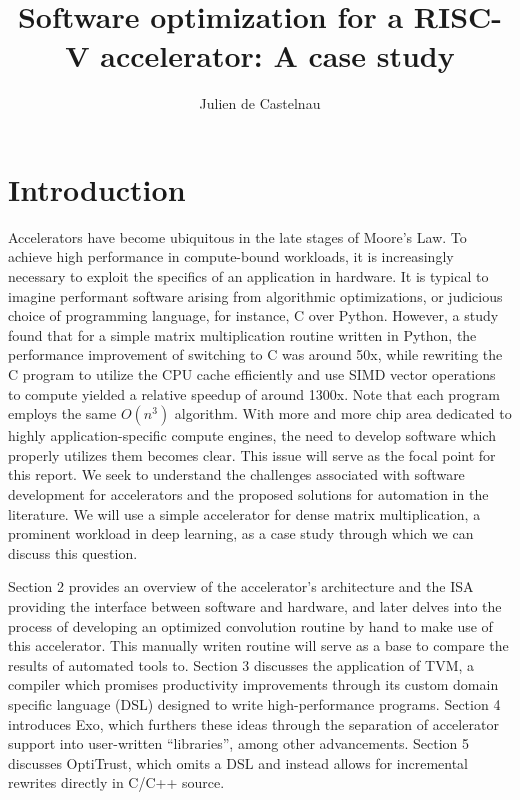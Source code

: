\documentclass[acmsmall, nonacm=true]{acmart}
\begin{document}
\sloppy %

\title{Software optimization for a RISC-V accelerator: A case study}

\author{Julien de Castelnau}

\renewcommand{\shortauthors}{de Castelnau}


\maketitle

\section{Introduction} 
Accelerators have become ubiquitous in the late stages of Moore's Law. To achieve high performance in compute-bound workloads, it is increasingly necessary to exploit the specifics of an application in hardware. It is typical to imagine performant software arising from algorithmic optimizations, or judicious choice of programming language, for instance, C over Python. However, a study\cite{doi:10.1126/science.aam9744} found that for a simple matrix multiplication routine written in Python, the performance improvement of switching to C was around 50x, while rewriting the C program to utilize the CPU cache efficiently and use SIMD vector operations to compute yielded a relative speedup of around 1300x. Note that each program employs the same $O(n^3)$ algorithm. With more and more chip area dedicated to highly application-specific compute engines, the need to develop software which properly utilizes them becomes clear. This issue will serve as the focal point for this report. We seek to understand the challenges associated with software development for accelerators and the proposed solutions for automation in the literature. We will use a simple accelerator for dense matrix multiplication, a prominent workload in deep learning, as a case study through which we can discuss this question.
    
Section 2 provides an overview of the accelerator's architecture and the ISA providing the interface between software and hardware, and later delves into the process of developing an optimized convolution routine by hand to make use of this accelerator. 
This manually writen routine will serve as a base to compare the results of automated tools to.  
Section 3 discusses the application of TVM, a compiler which promises productivity improvements through its custom domain specific language (DSL) designed to write high-performance programs. Section 4 introduces Exo, which furthers these ideas through the separation of accelerator support into user-written ``libraries'', among other advancements. Section 5 discusses OptiTrust, which omits a DSL and instead allows for incremental rewrites directly in C/C++ source.  
\end{document}
